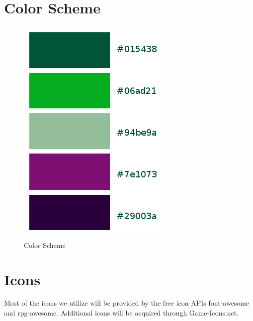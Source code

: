 \documentclass[12pt,a4paper]{report}
\begin{document}
	\section{Color Scheme}
	\begin{figure}[H]
		\centering
		\includegraphics[scale=.5]{colors}
		\caption{Color Scheme}
		\label{fig: Color Scheme}
	\end{figure}
	\lipsum[4]
	\newpage
	\section{Icons}
	Most of the icons we utilize will be provided by the free icon APIs font-awesome and rpg-awesome. Additional icons will be acquired through Game-Icons.net.
\end{document}
